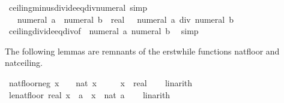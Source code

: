 \begin{isabellebody}
%
\endisadelimproof
\isanewline
{}\isamarkupfalse%
\ ceiling{\isacharunderscore}{\kern0pt}minus{\isacharunderscore}{\kern0pt}divide{\isacharunderscore}{\kern0pt}eq{\isacharunderscore}{\kern0pt}div{\isacharunderscore}{\kern0pt}numeral\ {\isacharbrackleft}{\kern0pt}simp{\isacharbrackright}{\kern0pt}{\isacharcolon}{\kern0pt}\isanewline
\ \ {\isachardoublequoteopen}{\isasymlceil}{\isacharminus}{\kern0pt}\ {\isacharparenleft}{\kern0pt}numeral\ a\ {\isacharslash}{\kern0pt}\ numeral\ b\ {\isacharcolon}{\kern0pt}{\isacharcolon}{\kern0pt}\ real{\isacharparenright}{\kern0pt}{\isasymrceil}\ {\isacharequal}{\kern0pt}\ {\isacharminus}{\kern0pt}\ {\isacharparenleft}{\kern0pt}numeral\ a\ div\ numeral\ b{\isacharparenright}{\kern0pt}{\isachardoublequoteclose}\isanewline
%
\isadelimproof
\ \ %
\endisadelimproof
%
\isatagproof
{}\isamarkupfalse%
\ ceiling{\isacharunderscore}{\kern0pt}divide{\isacharunderscore}{\kern0pt}eq{\isacharunderscore}{\kern0pt}div{\isacharbrackleft}{\kern0pt}of\ {\isachardoublequoteopen}{\isacharminus}{\kern0pt}\ numeral\ a{\isachardoublequoteclose}\ {\isachardoublequoteopen}numeral\ b{\isachardoublequoteclose}{\isacharbrackright}{\kern0pt}\ \isamarkupfalse%
\ simp%
\endisatagproof
{\isafoldproof}%
%
\isadelimproof
%
\endisadelimproof
%
\begin{isamarkuptext}%
The following lemmas are remnants of the erstwhile functions natfloor
  and natceiling.%
\end{isamarkuptext}\isamarkuptrue%
\isamarkupfalse%
\ nat{\isacharunderscore}{\kern0pt}floor{\isacharunderscore}{\kern0pt}neg{\isacharcolon}{\kern0pt}\ {\isachardoublequoteopen}x\ {\isasymle}\ {}\ {\isasymLongrightarrow}\ nat\ {\isasymlfloor}x{\isasymrfloor}\ {\isacharequal}{\kern0pt}\ {}{\isachardoublequoteclose}\isanewline
\ \ \ x\ {\isacharcolon}{\kern0pt}{\isacharcolon}{\kern0pt}\ real\isanewline
%
\isadelimproof
\ \ %
\endisadelimproof
%
\isatagproof
{}\isamarkupfalse%
\ linarith%
\endisatagproof
{\isafoldproof}%
%
\isadelimproof
\isanewline
%
\endisadelimproof
\isanewline
{}\isamarkupfalse%
\ le{\isacharunderscore}{\kern0pt}nat{\isacharunderscore}{\kern0pt}floor{\isacharcolon}{\kern0pt}\ {\isachardoublequoteopen}real\ x\ {\isasymle}\ a\ {\isasymLongrightarrow}\ x\ {\isasymle}\ nat\ {\isasymlfloor}a{\isasymrfloor}{\isachardoublequoteclose}\isanewline
%
\isadelimproof
\ \ %
\endisadelimproof
%
\isatagproof
{}\isamarkupfalse%
\ linarith%
\endisatagproof
{\isafoldproof}%
%
\isadelimproof

\end{isabellebody}
